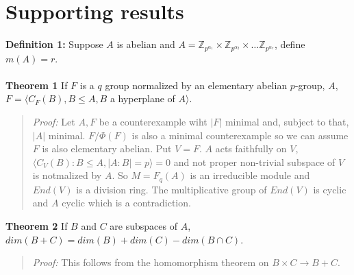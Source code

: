 \section{Supporting results}
{\bf Definition 1:}  Suppose $A$ is abelian and
$A= {\mathbb Z}_{p^{\alpha_1}} \times {\mathbb Z}_{p^{\alpha_2}} \times \ldots {\mathbb Z}_{p^{\alpha_r}}$, define
$m(A)=r$.
\\
\\
{\bf Theorem 1} If $F$ is a $q$ group normalized by an elementary abelian $p$-group, $A$,
$F= \langle C_F(B), B \leq A, B$ a hyperplane of $A \rangle$.
\begin{quote}
\emph{Proof:}  
Let $A, F$ be a counterexample wiht $|F|$ minimal and, subject to that, $|A|$ minimal.
$F/\Phi(F)$ is also a minimal counterexample so we can assume $F$ is also elementary abelian.
Put $V=F$.
$A$ acts faithfully on $V$, $\langle C_V(B): B \leq A, |A:B|=p \rangle = 0$ and
not proper non-trivial subspace of $V$ is notmalized by $A$. So $M=F_q(A)$ is an irreducible
module and $End(V)$ is a division ring. The multiplicative group of $End(V)$ is cyclic and $A$ cyclic
which is a contradiction.
\end{quote}
{\bf Theorem 2} If $B$ and $C$ are subspaces of $A$, $dim(B+C)= dim(B) + dim(C)- dim(B \cap C)$.
\begin{quote}
\emph{Proof:}  This follows from the homomorphism theorem on $B \times C \rightarrow B+C$.
\end{quote}
